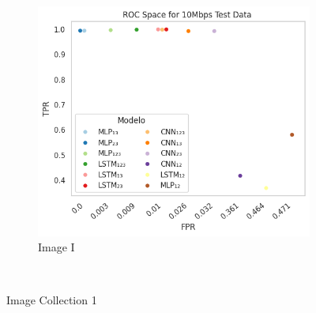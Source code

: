 \documentclass[a4paper,fleqn]{cas-sc}
\begin{document}
\begin{figure}
\begin{minipage}[t]{0.46\textwidth}
			~
			\begin{subfigure}[t]{0.33\textwidth}
				\includegraphics[draft=false, width=\textwidth]{./figs/ROC-Space-Test-Data-10Mbps.png} 
				\caption{Image I}
				\label{fig:1c}
			\end{subfigure}%
			~
		\hfill
		\caption{ Image Collection 1\hspace{10cm}}
		\label{fig:Pasnatsch}
		

\end{minipage}
\end{figure}
\end{document}
